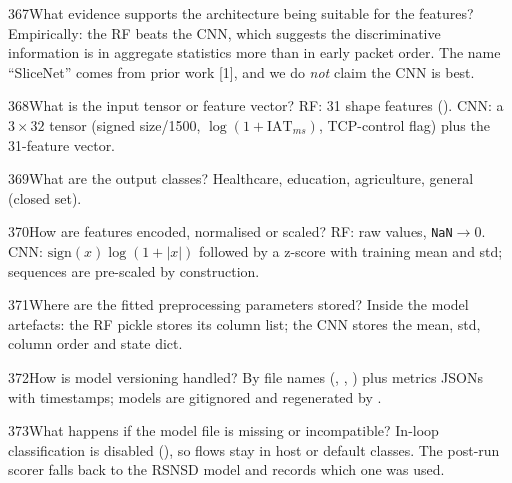 \begin{qa}{367}{What evidence supports the architecture being suitable for the features?}
Empirically: the RF beats the CNN, which suggests the discriminative information is in aggregate statistics more than
in early packet order. The name ``SliceNet'' comes from prior work [1], and we do \emph{not} claim the CNN is best.
\end{qa}

\begin{qa}{368}{What is the input tensor or feature vector?}
RF: 31 shape features (). CNN: a $3\times32$ tensor (signed size/1500, $\log(1+\text{IAT}_{ms})$,
TCP-control flag) plus the 31-feature vector.
\end{qa}

\begin{qa}{369}{What are the output classes?}
Healthcare, education, agriculture, general (closed set).
\end{qa}

\begin{qa}{370}{How are features encoded, normalised or scaled?}
RF: raw values, \texttt{NaN}$\rightarrow$0. CNN: $\text{sign}(x)\log(1+|x|)$ followed by a z-score with training
mean and std; sequences are pre-scaled by construction.
\end{qa}

\begin{qa}{371}{Where are the fitted preprocessing parameters stored?}
Inside the model artefacts: the RF pickle stores its column list; the CNN  stores the mean, std, column
order and state dict.
\end{qa}

\begin{qa}{372}{How is model versioning handled?}
By file names (, , ) plus metrics JSONs
with timestamps; models are gitignored and regenerated by .
\end{qa}

\begin{qa}{373}{What happens if the model file is missing or incompatible?}
In-loop classification is disabled (), so flows stay in host or default classes. The post-run
scorer falls back to the RSNSD model and records which one was used.
\end{qa}

